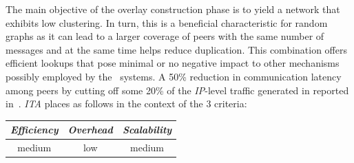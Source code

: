 The main objective of the overlay construction phase
is to yield a network that exhibits low clustering. 
In turn, this is 
a beneficial characteristic for random graphs as it can lead to a
larger coverage of peers with the same number of messages and 
at the same time helps reduce duplication. 
This combination offers efficient lookups that pose minimal 
or no negative impact to other mechanisms possibly employed by 
the \p\ systems.
A 50\% reduction in communication latency among peers by cutting off 
some 20\% of the \emph{IP}-level traffic generated 
in reported in~\cite{PRFM2009}.
\emph{ITA} places as follows in the context of the $3$ criteria:
%
\begin{center}
{\footnotesize
\begin{tabular}{ccc}
\emph{Efficiency} & \emph{Overhead} & \emph{Scalability} \\
\hline
medium &
low &
medium
\end{tabular}
}
\end{center}

